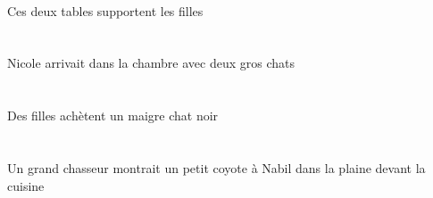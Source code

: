 \begin{exe}
   \DEMDuErgG{}   \tableDDuErgG{}   \DEFPlAbsG{}   \filleCPlAbsG{}  \supporterVtPrsCPlG{} \\
 Ces deux tables supportent les filles
\ex\glll
    \INDDuObl{}   \grosDDu{}   \chatDDuObl{}   \AVEC{}   \INDSgAbs{}   \NicoleBSgAbs{}    \DEFSgObl{}   \chambreBSgObl{}   \DANS{}  \arriverViPstBSg{} \\
    \INDDuOblP{}   \grosDDuP{}   \chatDDuOblP{}   \AVECP{}   \INDSgAbsP{}   \NicoleBSgAbsP{}    \DEFSgOblP{}   \chambreBSgOblP{}   \DANSP{}  \arriverViPstBSgP{} \\
    \INDDuOblG{}   \grosDDuG{}   \chatDDuOblG{}   \AVECG{}   \INDSgAbsG{}   \NicoleBSgAbsG{}    \DEFSgOblG{}   \chambreBSgOblG{}   \DANSG{}  \arriverViPstBSgG{} \\
 Nicole arrivait dans la chambre avec deux gros chats
\ex\glll
   \INDPlErg{}   \filleCPlErg{}   \INDSgAbs{}   \maigreDSg{}   \noirDSg{}   \chatDSgAbs{}  \acheterVtPrsDSg{} \\
   \INDPlErgP{}   \filleCPlErgP{}   \INDSgAbsP{}   \maigreDSgP{}   \noirDSgP{}   \chatDSgAbsP{}  \acheterVtPrsDSgP{} \\
   \INDPlErgG{}   \filleCPlErgG{}   \INDSgAbsG{}   \maigreDSgG{}   \noirDSgG{}   \chatDSgAbsG{}  \acheterVtPrsDSgG{} \\
 Des filles achètent un maigre chat noir
\ex\glll
    \DEFSgObl{}    \DEFSgObl{}   \cuisineDSgObl{}   \DEVANT{}   \plaineASgObl{}   \DANS{}   \INDSgErg{}   \grandCSg{}   \chasseurCSgErg{}    \INDSgDat{}   \NabilDSgDat{}   \INDSgAbs{}   \petitCSg{}   \coyoteCSgAbs{}  \montrerVdPstCSg{} \\
    \DEFSgOblP{}    \DEFSgOblP{}   \cuisineDSgOblP{}   \DEVANTP{}   \plaineASgOblP{}   \DANSP{}   \INDSgErgP{}   \grandCSgP{}   \chasseurCSgErgP{}    \INDSgDatP{}   \NabilDSgDatP{}   \INDSgAbsP{}   \petitCSgP{}   \coyoteCSgAbsP{}  \montrerVdPstCSgP{} \\
    \DEFSgOblG{}    \DEFSgOblG{}   \cuisineDSgOblG{}   \DEVANTG{}   \plaineASgOblG{}   \DANSG{}   \INDSgErgG{}   \grandCSgG{}   \chasseurCSgErgG{}    \INDSgDatG{}   \NabilDSgDatG{}   \INDSgAbsG{}   \petitCSgG{}   \coyoteCSgAbsG{}  \montrerVdPstCSgG{} \\
 Un grand chasseur montrait un petit coyote à Nabil dans la plaine devant la cuisine
\ex\glll
   \INDDuAbs{}   \grosDDu{}   \chatDDuAbs{}    \DEFSgObl{}    \DEFSgObl{}   \grandBSg{}   \chambreBSgObl{}   \DE{}   \petitDSg{}   \tableDSgObl{}   \SOUS{}  \dormirViPrsDDu{} \\
   \INDDuAbsP{}   \grosDDuP{}   \chatDDuAbsP{}    \DEFSgOblP{}    \DEFSgOblP{}   \grandBSgP{}   \chambreBSgOblP{}   \DEP{}   \petitDSgP{}   \tableDSgOblP{}   \SOUSP{}  \dormirViPrsDDuP{} \\

\end{exe}
